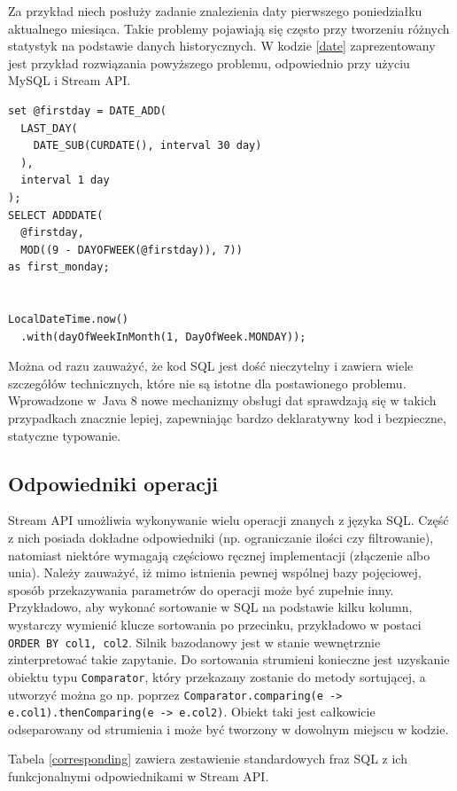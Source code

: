 \documentclass[12pt,twoside,openright]{extarticle}
\begin{document}
    Za przykład niech posłuży zadanie znalezienia daty pierwszego poniedziałku aktualnego miesiąca. Takie problemy pojawiają się często przy tworzeniu różnych statystyk na podstawie danych historycznych. W kodzie \ref{date} zaprezentowany jest przykład rozwiązania powyższego problemu, odpowiednio przy użyciu MySQL i Stream API.
    

\begin{lstlisting}[label=date, caption=Problem znalezienia pierwszego poniedziałku w miesiącu]
set @firstday = DATE_ADD(
  LAST_DAY(
    DATE_SUB(CURDATE(), interval 30 day)
  ),
  interval 1 day
);
SELECT ADDDATE(
  @firstday,
  MOD((9 - DAYOFWEEK(@firstday)), 7))
as first_monday;


LocalDateTime.now()
  .with(dayOfWeekInMonth(1, DayOfWeek.MONDAY));
\end{lstlisting}

Można od razu zauważyć, że kod SQL jest dość nieczytelny i zawiera wiele szczegółów technicznych, które nie są istotne dla postawionego problemu. Wprowadzone w~Java 8 nowe mechanizmy obsługi dat sprawdzają się w takich przypadkach znacznie lepiej, zapewniając bardzo deklaratywny kod i bezpieczne, statyczne typowanie.


\subsection{Odpowiedniki operacji} \label{counterparts}

    Stream API umożliwia wykonywanie wielu operacji znanych z języka SQL. Część z nich posiada dokładne odpowiedniki (np. ograniczanie ilości czy filtrowanie), natomiast niektóre wymagają częściowo ręcznej implementacji (złączenie albo unia). Należy zauważyć, iż mimo istnienia pewnej wspólnej bazy pojęciowej, sposób przekazywania parametrów do operacji może być zupełnie inny. Przykładowo, aby wykonać sortowanie w SQL na podstawie kilku kolumn, wystarczy wymienić klucze sortowania po przecinku, przykładowo w postaci \texttt{ORDER BY col1, col2}. Silnik bazodanowy jest w stanie wewnętrznie zinterpretować takie zapytanie. Do sortowania strumieni konieczne jest uzyskanie obiektu typu \texttt{Comparator}, który przekazany zostanie do metody sortującej, a utworzyć można go np. poprzez \texttt{Comparator.comparing(e -> e.col1).thenComparing(e -> e.col2)}. Obiekt taki jest całkowicie odseparowany od strumienia i może być tworzony w dowolnym miejscu w kodzie.

Tabela \ref{corresponding} zawiera zestawienie standardowych fraz SQL z ich funkcjonalnymi odpowiednikami w Stream API.
\end{document}
